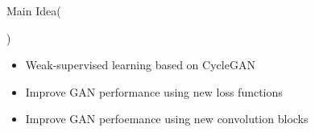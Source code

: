 \begin{tcolorbox}[colback=yellow!5!white, colframe=yellow!25!black, colbacktitle=green!50!white, coltitle=black, title={\large \textbf{Idea To Do}}]
	Main Idea\hspace{\fill}(\date{May 11, 2022})
	\tcbline

	\begin{itemize}
		\item {}  Weak-supervised learning based on CycleGAN
		\item {} Improve GAN performance using new loss functions
		\item {} Improve GAN perfoemance using new convolution blocks
	\end{itemize}
\end{tcolorbox}

\newpage